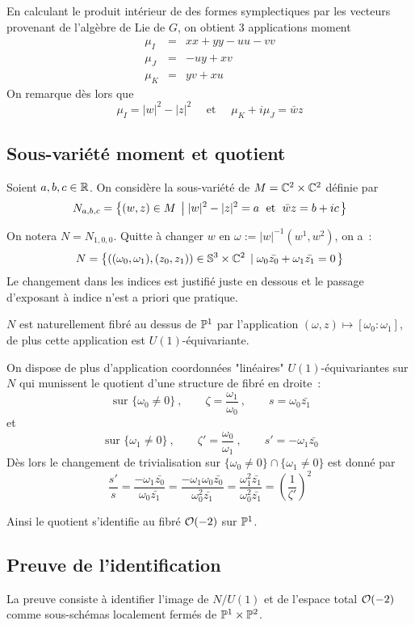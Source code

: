 \documentclass[a4paper,10pt]{article}
\begin{document}
En calculant le produit intérieur de des formes symplectiques par les vecteurs provenant de l'algèbre de Lie de $G$, on obtient $3$ applications moment
\begin{eqnarray*}
\mu_I & = & xx+yy-uu-vv\\
\mu_J & = & -uy+xv\\
\mu_K & = & yv+xu
\end{eqnarray*}
On remarque dès lors que 
\[
\mu_I = |w|^2 - |z|^2 \quad \text{ et } \quad \mu_K + i \mu_J = \bar{w}z
\]
\subsection{Sous-variété moment et quotient}
Soient $a,b,c \in \mathbb{R}$. On considère la sous-variété de $M = \mathbb{C}^2 \times \mathbb{C}^2$ définie par
\[
N_{a,b,c} = \left\lbrace {(w,z) \in M} \; \left| \; {|w|^2-|z|^2 = a \;\text{ et }\; \bar{w}z = b+ic} \right. \right\rbrace
\]

On notera $N = N_{1,0,0}$. Quitte à changer $w$ en $\omega := |w|^{-1}(w^1,w^2)$, on a~:
\[
N = \left\lbrace {((\omega_0,\omega_1),(z_0,z_1)) \in \mathbb{S}^3\times \mathbb{C}^2 } \; \left| \; {\omega_0\bar{z_0}+\omega_1\bar{z_1} = 0} \right. \right\rbrace
\]
Le changement dans les indices est justifié juste en dessous et le passage d'exposant à indice n'est a priori que pratique.

$N$ est naturellement fibré au dessus de $\mathbb{P}^1$ par l'application $(\omega,z) \mapsto [\omega_0:\omega_1]$, de plus cette application est $U(1)$-équivariante.

On dispose de plus d'application coordonnées "linéaires" $U(1)$-équivariantes sur $N$ qui munissent le quotient d'une structure de fibré en droite~:
\[
\text{ sur } \{ \omega_0 \neq 0 \}\ , \qquad \zeta = \dfrac{\omega_1}{\omega_0}\ ,  \qquad s = \omega_0 \bar{z_1}
\]
et
\[
\text{ sur } \{ \omega_1 \neq 0 \}\ , \qquad \zeta' = \dfrac{\omega_0}{\omega_1}\ , \qquad s' = -\omega_1 \bar{z_0}
\]
Dès lors le changement de trivialisation sur 
$\{ \omega_0 \neq 0 \} \cap \{ \omega_1 \neq 0 \}$ est donné par
\[
\dfrac{s'}{s} = \dfrac{-\omega_1 \bar{z_0}}{\omega_0 \bar{z_1}} = \dfrac{-\omega_1\omega_0 \bar{z_0}}{\omega_0^2 \bar{z_1}}
 = \dfrac{\omega_1^2 \bar{z_1}}{\omega_0^2 \bar{z_1}} = \left(\dfrac{1}{\zeta'}\right)^2
\]

Ainsi le quotient s'identifie au fibré $\mathcal{O}(-2)$ sur $\mathbb{P}^1$.

\subsection{Preuve de l'identification}
La preuve consiste à identifier l'image de $N/U(1)$ et de l'espace total $\mathcal{O}(-2)$ comme sous-schémas localement fermés de  $\mathbb{P}^1 \times \mathbb{P}^2$.
\end{document}
